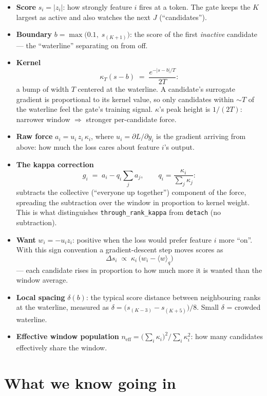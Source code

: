 \documentclass[11pt,a4paper]{article}
\newcommand{\code}[1]{\texttt{#1}}
\newcommand{\neff}{n_{\mathrm{eff}}}
\begin{document}
\begin{itemize}[leftmargin=1.4em]
\item \textbf{Score} $s_i = |z_i|$: how strongly feature $i$ fires at a token.
  The gate keeps the $K$ largest as active and also watches the next $J$
  (``candidates'').
\item \textbf{Boundary} $b = \max\bigl(0.1,\; s_{(K+1)}\bigr)$: the score of
  the first \emph{inactive} candidate --- the ``waterline'' separating on from
  off.
\item \textbf{Kernel}
  \[
    \kappa_T(s-b) \;=\; \frac{e^{-|s-b|/T}}{2T}:
  \]
  a bump of width $T$ centered at the waterline. A candidate's surrogate
  gradient is proportional to its kernel value, so only candidates within
  ${\sim}T$ of the waterline feel the gate's training signal. $\kappa$'s peak
  height is $1/(2T)$: narrower window $\Rightarrow$ stronger per-candidate
  force.
\item \textbf{Raw force} $a_i = u_i\, z_i\, \kappa_i$, where
  $u_i = \partial L/\partial y_i$ is the gradient arriving from above: how much
  the loss cares about feature $i$'s output.
\item \textbf{The kappa correction}
  \[
    g_i \;=\; a_i - q_i \sum_j a_j,
    \qquad q_i = \frac{\kappa_i}{\sum_j \kappa_j}:
  \]
  subtracts the collective (``everyone up together'') component of the force,
  spreading the subtraction over the window in proportion to kernel weight.
  This is what distinguishes \code{through\_rank\_kappa} from \code{detach}
  (no subtraction).
\item \textbf{Want} $w_i = -u_i z_i$: positive when the loss would prefer
  feature $i$ more ``on''. With this sign convention a gradient-descent step
  moves scores as
  \[
    \Delta s_i \;\propto\; \kappa_i\,\bigl(w_i - \langle w\rangle_q\bigr)
  \]
  --- each candidate rises in proportion to how much more it is wanted than
  the window average.
\item \textbf{Local spacing} $\delta(b)$: the typical score distance between
  neighbouring ranks at the waterline, measured as
  $\delta = \bigl(s_{(K-3)} - s_{(K+5)}\bigr)/8$. Small $\delta$ = crowded
  waterline.
\item \textbf{Effective window population}
  $\neff = \bigl(\sum_i \kappa_i\bigr)^2 \big/ \sum_i \kappa_i^2$: how many
  candidates effectively share the window.
\end{itemize}

\section{What we know going in}
\end{document}
